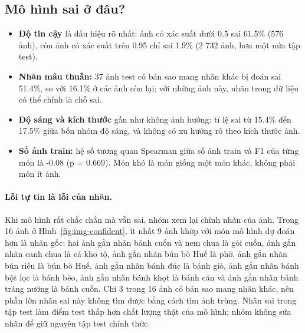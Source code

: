 \subsection{Mô hình sai ở đâu?}


\begin{itemize}
  \item \textbf{Độ tin cậy} là dấu hiệu rõ nhất: ảnh có xác suất dưới 0.5 sai 61.5\% (576 ảnh), còn ảnh có xác suất trên
        0.95 chỉ sai 1.9\% (2 732 ảnh, hơn một nửa tập test).
  \item \textbf{Nhãn mâu thuẫn:} 37 ảnh test có bản sao mang nhãn khác bị đoán sai 51.4\%, so với 16.1\% ở các ảnh còn lại;
        với những ảnh này, nhãn trong dữ liệu có thể chính là chỗ sai.
  \item \textbf{Độ sáng và kích thước} gần như không ảnh hưởng: tỉ lệ sai từ 15.4\% đến 17.5\% giữa bốn nhóm độ sáng, và
        không có xu hướng rõ theo kích thước ảnh.
  \item \textbf{Số ảnh train:} hệ số tương quan Spearman giữa số ảnh train và F1 của từng món là -0.08 (p = 0.669). Món khó
        là món giống một món khác, không phải món ít ảnh.
\end{itemize}


\paragraph{Lỗi tự tin là lỗi của nhãn.} Khi mô hình rất chắc chắn mà vẫn sai, nhóm xem lại chính nhãn của ảnh. Trong 16
ảnh ở Hình~\ref{fig:img-confident}, ít nhất 9 ảnh khớp với món mô hình dự đoán hơn là nhãn gốc: hai ảnh gắn nhãn bánh
cuốn và nem chua là gỏi cuốn, ảnh gắn nhãn canh chua là cá kho tộ, ảnh gắn nhãn bún bò Huế là phở, ảnh gắn nhãn bún
riêu là bún bò Huế, ảnh gắn nhãn bánh đúc là bánh giò, ảnh gắn nhãn bánh bột lọc là bánh bèo, ảnh gắn nhãn bánh khọt là
bánh căn và ảnh gắn nhãn bánh tráng nướng là bánh cuốn. Chỉ 3 trong 16 ảnh có bản sao mang nhãn khác, nên phần lớn nhãn
sai này không tìm được bằng cách tìm ảnh trùng. Nhãn sai trong tập test làm điểm test thấp hơn chất lượng thật của mô
hình; nhóm không sửa nhãn để giữ nguyên tập test chính thức.


